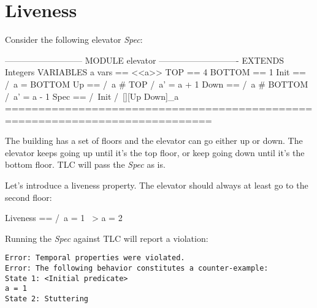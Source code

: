 \documentclass{report}
\begin{document}
\section{Liveness}

Consider the following elevator \textit{Spec}:
\begin{tla}
--------------------------- MODULE elevator ----------------------------
EXTENDS Integers
VARIABLES a
vars == <<a>>
TOP     == 4
BOTTOM  == 1
Init ==
    /\ a = BOTTOM
Up == 
    /\ a # TOP
    /\ a' = a + 1
Down == 
    /\ a # BOTTOM
    /\ a' = a - 1
Spec ==
  /\ Init
  /\ [][Up \/ Down]_a
=============================================================================
\end{tla}
\begin{tlatex}
\@x{}\moduleLeftDash{}\moduleRightDash\@xx{}%
%
%
%
%
%
%
%
%
%
%
%
%
%
%
%
%
\@x{}\bottombar\@xx{}%
\end{tlatex}

The building has a set of floors and the elevator can go either up or down. The
elevator keeps going up until it's the top floor, or keep going down until it's
the bottom floor. TLC will pass the \textit{Spec} as is.\newline

Let's introduce a liveness property. The elevator should always at least go 
to the second floor:\newline
\begin{tla}
Liveness == 
    /\ a = 1 ~> a = 2
\end{tla}
\begin{tlatex}
%
%
\end{tlatex}
\newline

Running the \textit{Spec} against TLC will report a violation:

\begin{verbatim}
Error: Temporal properties were violated.
Error: The following behavior constitutes a counter-example:
State 1: <Initial predicate>
a = 1
State 2: Stuttering
\end{verbatim}
\end{document}
